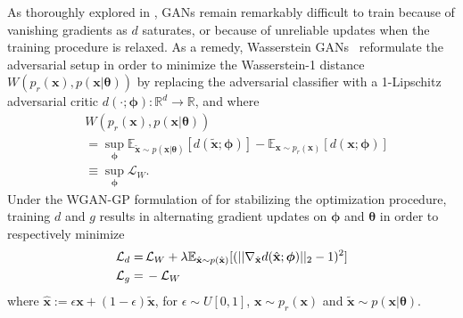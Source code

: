 \documentclass[twocolumn,superscriptaddress,aps]{revtex4-1}
\newcommand{\bftheta}{{\bm \theta}}
\newcommand{\bfphi}{{\bm \phi}}
\theoremstyle{plain}
\begin{document}
As thoroughly explored in \citep{2017arXiv170104862A}, GANs remain remarkably
difficult to train because of vanishing gradients as $d$ saturates, or because of
unreliable updates when the training procedure is relaxed. As a remedy,
Wasserstein GANs~\citep{2017arXiv170107875A} reformulate the adversarial
setup in order to minimize the Wasserstein-1 distance $W( p_r(\mathbf{x} ), p(\mathbf{x} | \bftheta)  )$
by replacing the adversarial classifier with a 1-Lipschitz adversarial critic
$d(\cdot; \bfphi) : \mathbb{R}^d \to \mathbb{R}$, and where
\begin{align}
& W( p_r(\mathbf{x} ), p(\mathbf{x} | \bftheta)  ) \nonumber \\
&= \sup_{\bfphi}  \mathbb{E}_{\tilde{\mathbf{x}}\sim p(\mathbf{x}|\bftheta)} [d(\tilde{\mathbf{x}}; \bfphi)] - \mathbb{E}_{\mathbf{x} \sim p_r(\mathbf{x})} [d(\mathbf{x}; \bfphi)] \nonumber \\
&\equiv \sup_{\bfphi} \mathcal{L}_W.
\end{align}
Under the WGAN-GP formulation of \cite{2017arXiv170400028G}
for stabilizing the optimization procedure,
training $d$ and $g$ results in alternating gradient updates on $\bfphi$ and $\bftheta$ in order to respectively minimize
\begin{align}
    {\cal L}_d =\,&  \mathcal{L}_W + \lambda \mathbb{E}_{\hat{\mathbf{x}} \sim p({\hat{\mathbf{x}})}} [(|| \nabla_{\hat{\mathbf{x}}} d({\hat{\mathbf{x}}};\bfphi) ||_2 - 1)^2] \\
    {\cal L}_g =\,& - \mathcal{L}_W
\end{align}
%
where ${\hat{\mathbf{x}}} := \epsilon \mathbf{x} +
(1-\epsilon)\tilde{\mathbf{x}}$, for $\epsilon \sim U[0,1]$, $\mathbf{x} \sim
p_r(\mathbf{x})$ and $\tilde{\mathbf{x}} \sim p(\mathbf{x}|\bftheta)$.
\end{document}
